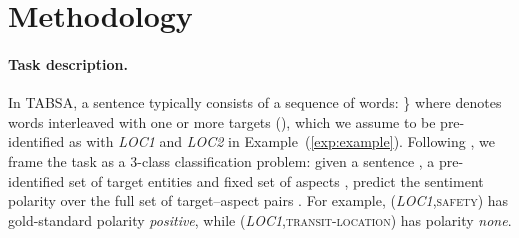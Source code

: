 \documentclass[11pt,a4paper]{article}
\newcommand{\lex}[1]{\textit{#1}\xspace}
\newcommand{\aspect}[1]{\textsc{#1}\xspace}
\newcommand{\exref}[2][]{Example#1~(\ref{#2})\xspace}
\begin{document}
 \section{Methodology}
\label{sec:model}

\paragraph{Task description.} 
In TABSA, a sentence  typically consists of a sequence of words: \} where  denotes words interleaved with one or more targets (), which we assume to be pre-identified as with \lex{LOC1} and \lex{LOC2} in \exref{exp:example}. Following , we frame the task as a 3-class classification problem: given a sentence , a pre-identified set of target entities  and fixed set of aspects , predict the sentiment polarity  over the full set of target--aspect pairs . For example, (\lex{LOC1},\aspect{safety}) has gold-standard polarity \textit{positive}, while (\lex{LOC1},\aspect{transit-location}) has polarity \textit{none}.
\end{document}
